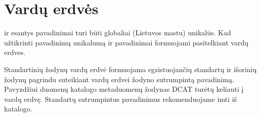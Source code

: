 \documentclass[letterpaper,10pt,lithuanian]{sphinxmanual}
\begin{document}
\sphinxstepscope


\section{Vardų erdvės}
\label{\detokenize{vardu-erdves:vardu-erdves}}\label{\detokenize{vardu-erdves:ns}}\label{\detokenize{vardu-erdves::doc}}
\sphinxAtStartPar
{\hyperref[\detokenize{formatas:dataset}]{}} ir {\hyperref[\detokenize{formatas:model}]{}} esantys pavadinimai turi būti globaliai
(Lietuvos mastu) unikalūs. Kad užtikrinti pavadinimų unikalumą {\hyperref[\detokenize{formatas:dataset}]{}}
ir {\hyperref[\detokenize{formatas:model}]{}} pavadinimai formuojami pasitelkiant vardų erdves.


\begin{fulllineitems}

\pysigstartsignatures
\pysigline
{}
\pysigstopsignatures
\sphinxAtStartPar
{}

\sphinxAtStartPar
Standartinių žodynų vardų erdvė formuojama egzistuojančių standartų ir
išorinių žodynų pagrindu suteikiant vardų erdvei  žodyno
sutrumpintą pavadinimą. Pavyzdžiui duomenų katalogo metaduomenų žodynas
DCAT turėtų keliauti į  vardų erdvę. Standartų sutrumpintus
pavadinimus rekomenduojame imti iš  katalogo.

\end{fulllineitems}
\end{document}
